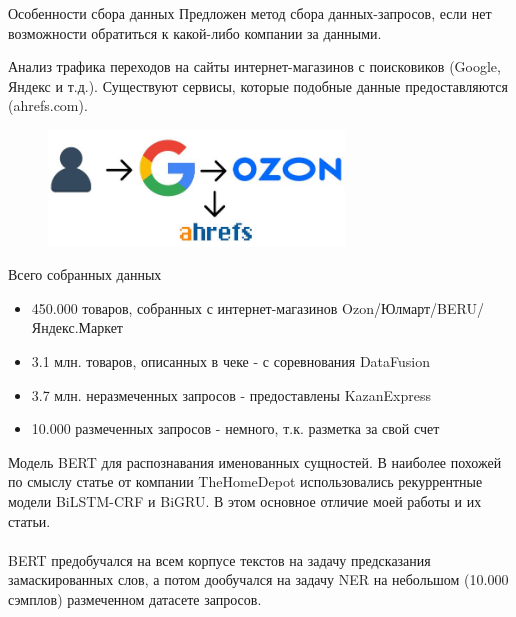 \begin{frame}{Особенности сбора данных}
    Предложен метод сбора данных-запросов, если нет возможности обратиться к какой-либо компании за данными.
    
    Анализ трафика переходов на сайты интернет-магазинов с поисковиков (Google, Яндекс и т.д.). Существуют сервисы, которые подобные данные предоставляются (ahrefs.com).

	\begin{figure}[H]
		\includegraphics[width=0.7\textwidth]{ahrefs.jpg}
		\label{fig:sample}
	\end{figure}
\end{frame}

\begin{frame}{Всего собранных данных}
\begin{itemize}
    \item 450.000 товаров, собранных с интернет-магазинов Ozon/Юлмарт/BERU/Яндекс.Маркет
    \item 3.1 млн. товаров, описанных в чеке - с соревнования DataFusion
    \item 3.7 млн. неразмеченных запросов - предоставлены KazanExpress
    \item 10.000 размеченных запросов - немного, т.к. разметка за свой счет
\end{itemize}
\end{frame}

\begin{frame}{Модель}
    BERT для распознавания именованных сущностей. В наиболее похожей по смыслу статье от компании TheHomeDepot использовались рекуррентные модели BiLSTM-CRF и BiGRU. В этом основное отличие моей работы и их статьи.\\\\
    BERT предобучался на всем корпусе текстов на задачу предсказания замаскированных слов, а потом дообучался на задачу NER на небольшом (10.000 сэмплов) размеченном датасете запросов.\\
    

\end{frame}

